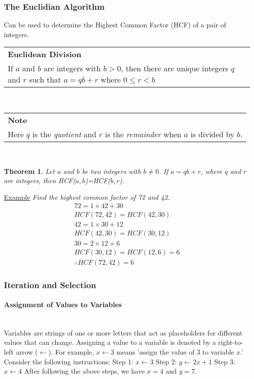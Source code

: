 \documentclass[a4paper]{article}
\newenvironment{Note}{
	\bgroup
	\def\arraystretch{1.5}
	\begin{NiceTabularX}{\textwidth}{X}
		\CodeBefore
		\columncolor{red!15}{1}
		\Body
		\textbf{Note} \\
}{
	\end{NiceTabularX}
	\egroup\mbox{}\\
}{}
\begin{document}
			\subsubsection{The Euclidian Algorithm}
				Can be used to determine the Highest Common Factor (HCF) of a pair of integers.
				\bgroup
				\def\arraystretch{1.5}
				\begin{table}[h]
					\centering
					\begin{tabularx}{\textwidth}{|X|}
						\hline
						\textbf{Euclidean Division} \\
						If $a$ and $b$ are integers with $b>0$, then there are unique integers $q$ and $r$ such that $a=qb+r$ where $0\le r<b$ \\
						\hline
					\end{tabularx}
				\end{table}
				\egroup\\
				\begin{Note}
					Here $q$ is the \textit{quotient} and $r$ is the \textit{remainder} when $a$ is divided by $b$.
				\end{Note}
				\newtheorem*{euclidianDivTheorem*}{Theorem}
				\begin{euclidianDivTheorem*}
					Let $a$ and $b$ be two integers with $b\neq0$. If $a=qb+r$, where $q$ and $r$ are integers, then HCF($a,b$)=HCF($b,r$).
				\end{euclidianDivTheorem*}
				\noindent\underline{Example}\newline
				\textit{Find the highest common factor of 72 and 42.}
				\begin{gather*}
					72=1\times42+30 \\
					HCF(72,42)=HCF(42,30) \\
					42=1\times30+12 \\
					HCF(42,30)=HCF(30,12) \\
					30=2\times12+6 \\
					HCF(30,12)=HCF(12,6)=6 \\
					\therefore HCF(72,42)=6
				\end{gather*}
			\subsubsection{Iteration and Selection}
				\paragraph{Assignment of Values to Variables}\mbox{}\\
					Variables are strings of one or more letters that act as placeholders for different values that can change. Assigning a value to a variable is denoted by a right-to-left arrow ($\leftarrow$). For example, $x\leftarrow3$ means 'assign the value of 3 to variable $x$.'\newline\newline
					Consider the following instructions:\newline
					Step 1: $x\leftarrow3$ \newline
					Step 2: $y\leftarrow2x+1$ \newline
					Step 3: $x\leftarrow4$ \newline
					After following the above steps, we have $x=4$ and $y=7$.
\end{document}
